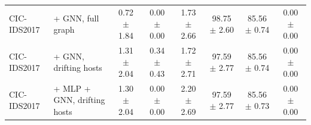 \begin{table}[t]
\begin{tabular}{llcccccc}
CIC-IDS2017 & + GNN, full graph & 0.72 $\pm$ 1.84 & 0.00 $\pm$ 0.00 & 1.73 $\pm$ 2.66 & 98.75 $\pm$ 2.60 & 85.56 $\pm$ 0.74 & 0.00 $\pm$ 0.00 \\
CIC-IDS2017 & + GNN, drifting hosts & 1.31 $\pm$ 2.04 & 0.34 $\pm$ 0.43 & 1.72 $\pm$ 2.71 & 97.59 $\pm$ 2.77 & 85.56 $\pm$ 0.74 & 0.00 $\pm$ 0.00 \\
CIC-IDS2017 & + MLP + GNN, drifting hosts & 1.30 $\pm$ 2.04 & 0.00 $\pm$ 0.00 & 2.20 $\pm$ 2.69 & 97.59 $\pm$ 2.77 & 85.56 $\pm$ 0.73 & 0.00 $\pm$ 0.00 \\
\bottomrule
\end{tabular}
\end{table}
